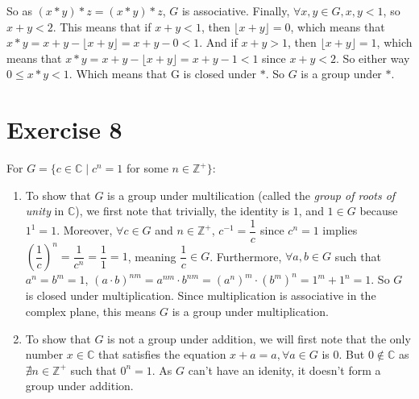 \documentclass{article}
\newcommand{\Z}{\mathbb{Z}}
\newcommand{\C}{\mathbb{C}}
\begin{document}
    So as $(x \ast y) \ast z = (x \ast y) \ast z$,
    $G$ is associative.
    Finally, $\forall x, y \in G, x, y < 1$,
    so $x + y < 2$.
    This means that if $x + y < 1$,
    then  $\lfloor x + y \rfloor = 0$,
    which means that $x \ast y = x + y - \lfloor x + y \rfloor = x + y - 0 < 1$.
    And if $x + y > 1$,
    then $\lfloor x + y \rfloor = 1$,
    which means that $x \ast y = x + y - \lfloor x + y \rfloor = x + y - 1 < 1$
    since $x + y < 2$.
    So either way $0 \leqslant x \ast y < 1$.
    Which means that G is closed under $\ast$.
    So $G$ is a group under $\ast$.

    
    \section*{Exercise 8}
    For $G = \{c \in \C \mid c^{n} = 1$ for some $n \in \Z^{+}\}$:
    \begin{enumerate}[label=\textbf{\alph*.}]
        \item 
            To show that $G$ is a group under multilication
            (called the \textit{group of roots of unity} in $\C$),
            we first note that trivially, the identity is $1$,
            and $1 \in G$ because $1^{1} = 1$.
            Moreover, $\forall c \in G$ and $n \in \Z^{+}$,
            $c^{-1} = \dfrac{1}{c}$
            since $c^{n} = 1$
            implies $(\dfrac{1}{c})^{n} = \dfrac{1}{c^{n}} = \dfrac{1}{1} = 1$,
            meaning $\dfrac{1}{c} \in G$.
            Furthermore, $\forall a, b \in G$
            such that $a^{n} = b^{m} = 1$,
            $(a \cdot b)^{nm}
            = a^{nm} \cdot b^{nm}
            = (a^{n})^{m} \cdot (b^{m})^{n}
            = 1^{m} + 1^{n}
            = 1$.
            So $G$ is closed under multiplication.
            Since multiplication is associative in the complex plane,
            this means $G$ is a group under multiplication.
        \item 
            To show that $G$ is not a group under addition,
            we will first note that the only number $x \in \C$
            that satisfies the equation $x + a = a, \forall a \in G$ is $0$.
            But $0 \notin \C$
            as $\nexists n \in \Z^{+}$
            such that $0^n = 1$.
            As $G$ can't have an idenity,
            it doesn't form a group under addition. 
    \end{enumerate}
\end{document}
